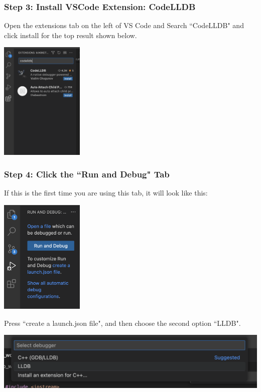 \subsubsection{Step 3: Install VSCode Extension: CodeLLDB}

Open the extensions tab on the left of VS Code and Search ``CodeLLDB" and click install for the top result shown below.

\includegraphics[width=0.3\textwidth]{images/macDebuggerSetup/debugger_mac_2.png}

\subsubsection{Step 4: Click the ``Run and Debug" Tab}

If this is the first time you are using this tab, it will look like this:

\includegraphics[width=0.3\textwidth]{images/macDebuggerSetup/debugger_mac_3.png}

Press ``create a launch.json file", and then choose the second option ``LLDB".

\includegraphics[width=\textwidth]{images/macDebuggerSetup/debugger_mac_4.png}

